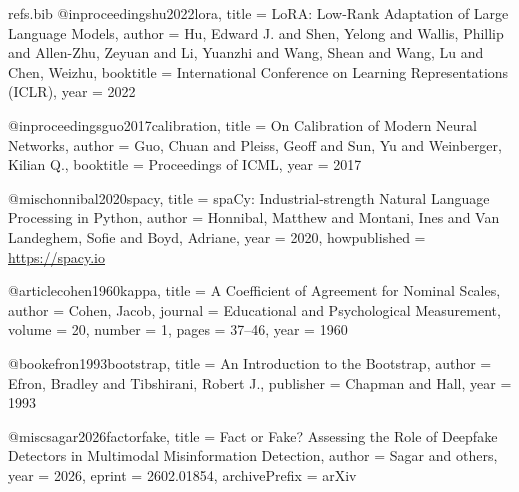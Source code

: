\begin{filecontents*}[overwrite]{refs.bib}
@inproceedings{hu2022lora,
  title     = {{LoRA}: Low-Rank Adaptation of Large Language Models},
  author    = {Hu, Edward J. and Shen, Yelong and Wallis, Phillip and Allen-Zhu, Zeyuan and Li, Yuanzhi and Wang, Shean and Wang, Lu and Chen, Weizhu},
  booktitle = {International Conference on Learning Representations (ICLR)},
  year      = {2022}
}

@inproceedings{guo2017calibration,
  title     = {On Calibration of Modern Neural Networks},
  author    = {Guo, Chuan and Pleiss, Geoff and Sun, Yu and Weinberger, Kilian Q.},
  booktitle = {Proceedings of ICML},
  year      = {2017}
}

@misc{honnibal2020spacy,
  title        = {{spaCy}: Industrial-strength Natural Language Processing in {Python}},
  author       = {Honnibal, Matthew and Montani, Ines and Van Landeghem, Sofie and Boyd, Adriane},
  year         = {2020},
  howpublished = {\url{https://spacy.io}}
}

@article{cohen1960kappa,
  title   = {A Coefficient of Agreement for Nominal Scales},
  author  = {Cohen, Jacob},
  journal = {Educational and Psychological Measurement},
  volume  = {20},
  number  = {1},
  pages   = {37--46},
  year    = {1960}
}

@book{efron1993bootstrap,
  title     = {An Introduction to the Bootstrap},
  author    = {Efron, Bradley and Tibshirani, Robert J.},
  publisher = {Chapman and Hall},
  year      = {1993}
}

@misc{sagar2026factorfake,
  title         = {Fact or Fake? Assessing the Role of Deepfake Detectors in Multimodal Misinformation Detection},
  author        = {Sagar and others},
  year          = {2026},
  eprint        = {2602.01854},
  archivePrefix = {arXiv}
}
\end{filecontents*}
\documentclass[11pt,a4paper]{article}

\usepackage[margin=2.4cm]{geometry}
\usepackage[T1]{fontenc}
\usepackage{lmodern}
\usepackage{microtype}
\usepackage{booktabs}
\usepackage{tabularx}
\usepackage{graphicx}
\usepackage{amsmath,amssymb}
\usepackage{xcolor}
\usepackage{caption}
\usepackage[numbers,sort&compress]{natbib}
\usepackage[hidelinks]{hyperref}
\Urlmuskip=0mu plus 2mu
\renewcommand{\UrlBreaks}{\do\/\do\-\do\_\do\.}

